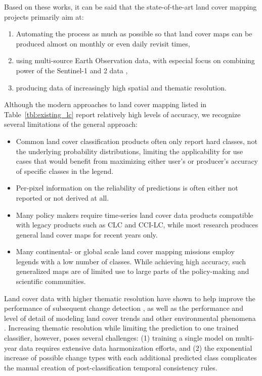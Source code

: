     
Based on these works, it can be said that the state-of-the-art land cover mapping projects primarily aim at: 
\begin{enumerate}\renewcommand{\labelenumi}{(\alph{enumi})}
    \item Automating the process as much as possible so that land cover maps can be produced almost on monthly or even daily revisit times,
    \item using multi-source Earth Observation data, with especial focus on combining power of the Sentinel-1 and 2 data \citep{venter2021continentalscale},
    \item producing data of increasingly high spatial and thematic resolution.
\end{enumerate}

Although the modern approaches to land cover mapping listed in Table\@~\ref{tbl:existing_lc} report relatively high levels of accuracy, we recognize several limitations of the general approach:

\begin{itemize}
  \item Common land cover classification products often only report hard classes, not the underlying probability distributions, limiting the applicability for use cases that would benefit from maximizing either user's or producer's accuracy of specific classes in the legend. 
  \item Per-pixel information on the reliability of predictions is often either not reported or not derived at all.
  \item Many policy makers require time-series land cover data products compatible with legacy products such as CLC and CCI-LC, while most research produces general land cover maps for recent years only. 
  \item Many continental- or global scale land cover mapping missions employ legends with a low number of classes. While achieving high accuracy, such generalized maps are of limited use to large parts of the policy-making and scientific communities. 
\end{itemize}

Land cover data with higher thematic resolution have shown to help improve the performance of subsequent change detection \citep{buyantuyev2007effects}, as well as the performance and level of detail of modeling land cover trends \citep{conway2009impact} and other environmental phenomena \citep{castilla2009impact,zhou2014relationships}. Increasing thematic resolution while limiting the prediction to one trained classifier, however, poses several challenges: (1) training a single model on multi-year data requires extensive data harmonization efforts, and (2) the exponential increase of possible change types with each additional predicted class complicates the manual creation of post-classification temporal consistency rules. 


